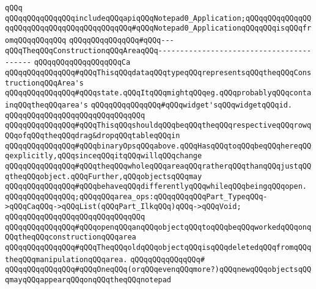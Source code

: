 \verb|qQQq|\newline
\verb|qQQqqQQqqQQqqQQqincludeqQQqapiqQQqNotepad0_Application;qQQqqQQqqQQqqQQqqQQqqQQqqQQqqQQqqQQqqQQqqQQq#qQQqNotepad0_ApplicationqQQqqQQqisqQQqfromqQQqqQQqqQQq|\newline
\newline
\verb|qQQqqQQqqQQqqQQq#qQQq---qQQqTheqQQqConstructionqQQqAreaqQQq-----------------------------------------|\newline
\newline
\verb|qQQqqQQqqQQqqQQqqQQqCa|\newline
\newline
\verb|qQQqqQQqqQQqqQQq#qQQqThisqQQqdataqQQqtypeqQQqrepresentsqQQqtheqQQqConstructionqQQqArea's|\newline
\verb|qQQqqQQqqQQqqQQq#qQQqstate.qQQqItqQQqmightqQQqeg.qQQqprobablyqQQqcontainqQQqtheqQQqarea's|\newline
\verb|qQQqqQQqqQQqqQQq#qQQqwidget'sqQQqwidgetqQQqid.|\newline
\newline
\verb|qQQqqQQqqQQqqQQqqQQqqQQqqQQqqQQq|\newline
\verb|qQQqqQQqqQQqqQQq#qQQqThisqQQqshouldqQQqbeqQQqtheqQQqrespectiveqQQqrowqQQqofqQQqtheqQQqdrag&dropqQQqtableqQQqin|\newline
\verb|qQQqqQQqqQQqqQQq#qQQqbinaryOpsqQQqabove.qQQqHasqQQqtoqQQqbeqQQqhereqQQqexplicitly,qQQqsinceqQQqitqQQqwillqQQqchange|\newline
\verb|qQQqqQQqqQQqqQQq#qQQqtheqQQqwholeqQQqareaqQQqratherqQQqthanqQQqjustqQQqtheqQQqobject.qQQqFurther,qQQqobjectsqQQqmay|\newline
\verb|qQQqqQQqqQQqqQQq#qQQqbehaveqQQqdifferentlyqQQqwhileqQQqbeingqQQqopen.|\newline
\newline
\verb|qQQqqQQqqQQqqQQq;qQQqqQQqarea_ops:qQQqqQQqqQQqPart_TypeqQQq->qQQqCaqQQq->qQQqList(qQQqPart_IlkqQQq)qQQq->qQQqVoid;|\newline
\verb|qQQqqQQqqQQqqQQqqQQqqQQqqQQqqQQq|\newline
\verb|qQQqqQQqqQQqqQQq#qQQqopenqQQqanqQQqobjectqQQqtoqQQqbeqQQqworkedqQQqonqQQqtheqQQqconstructionqQQqarea|\newline
\verb|qQQqqQQqqQQqqQQq#qQQqTheqQQqoldqQQqobjectqQQqisqQQqdeletedqQQqfromqQQqtheqQQqmanipulationqQQqarea.|\newline
\verb|qQQqqQQqqQQqqQQq#|\newline
\verb|qQQqqQQqqQQqqQQq#qQQqOneqQQq(orqQQqevenqQQqmore?)qQQqnewqQQqobjectsqQQqmayqQQqappearqQQqonqQQqtheqQQqnotepad|\newline
